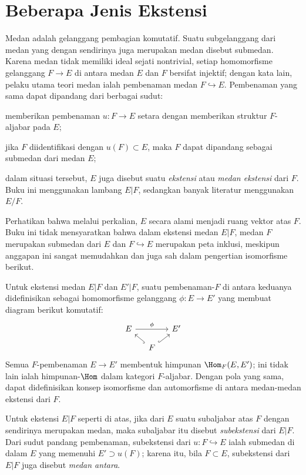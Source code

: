 \section{Beberapa Jenis Ekstensi}
Medan adalah gelanggang pembagian komutatif. Suatu subgelanggang dari medan yang dengan sendirinya juga merupakan medan disebut submedan. Karena medan tidak memiliki ideal sejati nontrivial, setiap homomorfisme gelanggang $F \to E$ di antara medan $E$ dan $F$ bersifat injektif; dengan kata lain, pelaku utama teori medan ialah pembenaman medan $F \hookrightarrow E$. Pembenaman yang sama dapat dipandang dari berbagai sudut:
\begin{compactitem}
	\item memberikan pembenaman $u: F \to E$ setara dengan memberikan struktur $F$-aljabar pada $E$;
	\item jika $F$ diidentifikasi dengan $u(F) \subset E$, maka $F$ dapat dipandang sebagai submedan dari medan $E$;
	\item dalam situasi tersebut, $E$ juga disebut suatu \emph{ekstensi} atau \emph{medan ekstensi} dari $F$. Buku ini menggunakan lambang $E|F$, sedangkan banyak literatur menggunakan $E/F$.
\end{compactitem}
Perhatikan bahwa melalui perkalian, $E$ secara alami menjadi ruang vektor atas $F$. Buku ini tidak mensyaratkan bahwa dalam ekstensi medan $E|F$, medan $F$ merupakan submedan dari $E$ dan $F \hookrightarrow E$ merupakan peta inklusi, meskipun anggapan ini sangat memudahkan dan juga sah dalam pengertian isomorfisme berikut.
 
\begin{convention}
	Untuk ekstensi medan $E|F$ dan $E'|F$, suatu pembenaman-$F$ di antara keduanya didefinisikan sebagai homomorfisme gelanggang $\phi: E \to E'$ yang membuat diagram berikut komutatif:
	\[\begin{tikzcd}[column sep=small, row sep=small]
		E \arrow[rr, "\phi"] & & E' \\
		& F \arrow[hookrightarrow, lu] \arrow[hookrightarrow, ru] &
	\end{tikzcd}\]
	Semua $F$-pembenaman $E \to E'$ membentuk himpunan $\Hom_F(E, E')$; ini tidak lain ialah himpunan-$\Hom$ dalam kategori $F$-aljabar. Dengan pola yang sama, dapat didefinisikan konsep isomorfisme dan automorfisme di antara medan-medan ekstensi dari $F$.
\end{convention}
Untuk ekstensi $E|F$ seperti di atas, jika dari $E$ suatu subaljabar atas $F$ dengan sendirinya merupakan medan, maka subaljabar itu disebut \emph{subekstensi} dari $E|F$. Dari sudut pandang pembenaman, subekstensi dari $u: F \hookrightarrow E$ ialah submedan di dalam $E$ yang memenuhi $E' \supset u(F)$; karena itu, bila $F \subset E$, subekstensi dari $E|F$ juga disebut \emph{medan antara}.

